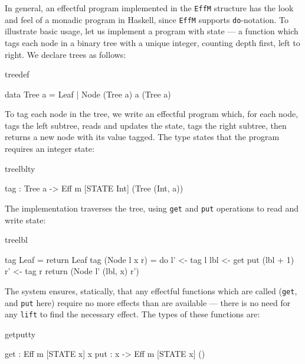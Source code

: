 In general, an effectful program implemented in the \texttt{EffM} structure has
the look and feel of a monadic program in Haskell, since \texttt{EffM} supports
\texttt{do}-notation. To illustrate basic usage, let us implement
a program with state --- a function which tags each node in a binary tree with
a unique integer, counting depth first, left to right. We declare trees as
follows:

\begin{SaveVerbatim}{treedef}

data Tree a = Leaf 
            | Node (Tree a) a (Tree a)

\end{SaveVerbatim}

\noindent
To tag each node in the tree, we write an effectful program which, for each
node, tags the left subtree, reads and updates the state, tags the right
subtree, then returns a new node with its value tagged. The type
states that the program requires an integer state:

\begin{SaveVerbatim}{treelblty}

tag : Tree a -> Eff m [STATE Int] (Tree (Int, a))

\end{SaveVerbatim}

\noindent
The implementation traverses the tree, using \texttt{get} and \texttt{put}
operations to read and write state:

\begin{SaveVerbatim}{treelbl}

tag Leaf = return Leaf
tag (Node l x r) 
     = do l' <- tag l
          lbl <- get
          put (lbl + 1)
          r' <- tag r
          return (Node l' (lbl, x) r')

\end{SaveVerbatim}

\noindent
The \Eff{} system ensures, statically, that any
effectful functions which are called (\texttt{get}, and \texttt{put} here)
require no more effects than are available --- there is no need for any
\texttt{lift} to find the necessary effect. The types of these functions are:

\begin{SaveVerbatim}{getputty}

get : Eff m [STATE x] x
put : x -> Eff m [STATE x] ()

\end{SaveVerbatim}

